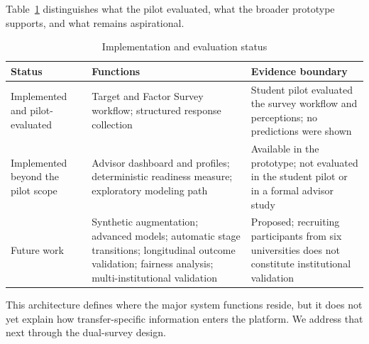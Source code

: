 \documentclass[letterpaper,11pt]{article}
\begin{document}
Table~\ref{tab:status} distinguishes what the pilot evaluated, what the broader prototype supports, and what remains aspirational.

\begin{table}[htbp]
\caption{Implementation and evaluation status}
\label{tab:status}
\centering
\begin{tabular}{@{}p{3.0cm}p{5.0cm}p{4.5cm}@{}}
\toprule
\textbf{Status} & \textbf{Functions} & \textbf{Evidence boundary} \\
\midrule
Implemented and pilot-evaluated & Target and Factor Survey workflow; structured response collection & Student pilot evaluated the survey workflow and perceptions; no predictions were shown \\
Implemented beyond the pilot scope & Advisor dashboard and profiles; deterministic readiness measure; exploratory modeling path & Available in the prototype; not evaluated in the student pilot or in a formal advisor study \\
Future work & Synthetic augmentation; advanced models; automatic stage transitions; longitudinal outcome validation; fairness analysis; multi-institutional validation & Proposed; recruiting participants from six universities does not constitute institutional validation \\
\bottomrule
\end{tabular}
\end{table}

This architecture defines where the major system functions reside, but it does not yet explain how transfer-specific information enters the platform. We address that next through the dual-survey design.
\end{document}
